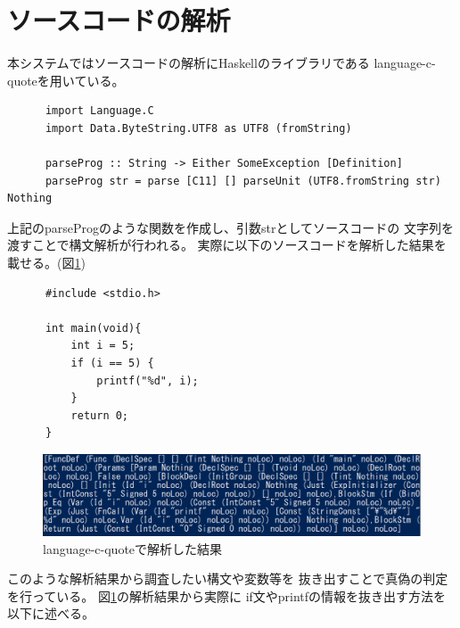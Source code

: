 \documentclass{csspaper}
\begin{document}
      \section{ソースコードの解析}
      本システムではソースコードの解析にHaskellのライブラリである
      language-c-quoteを用いている。

      \begin{lstlisting}
      import Language.C
      import Data.ByteString.UTF8 as UTF8 (fromString)

      parseProg :: String -> Either SomeException [Definition]
      parseProg str = parse [C11] [] parseUnit (UTF8.fromString str) Nothing
      \end{lstlisting}

      上記のparseProgのような関数を作成し、引数strとしてソースコードの
      文字列を渡すことで構文解析が行われる。
      実際に以下のソースコードを解析した結果を載せる。(図\ref{fig:lcq1})

      \begin{lstlisting}
      #include <stdio.h>
         
      int main(void){
          int i = 5;
          if (i == 5) {
              printf("%d", i);
          }
          return 0;
      }
      \end{lstlisting}

      \begin{figure}[h]
         \centering
         \includegraphics[width=13cm]{lcq1.png}
         \caption{language-c-quoteで解析した結果}
         \label{fig:lcq1}
      \end{figure}

      このような解析結果から調査したい構文や変数等を
      抜き出すことで真偽の判定を行っている。
      図\ref{fig:lcq1}の解析結果から実際に
      if文やprintfの情報を抜き出す方法を以下に述べる。
\end{document}
